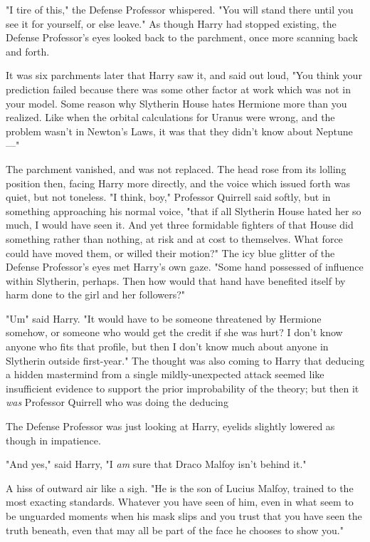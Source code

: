 "I tire of this," the Defense Professor whispered. "You will stand there until
you see it for yourself, or else leave." As though Harry had stopped existing,
the Defense Professor's eyes looked back to the parchment, once more scanning
back and forth.

It was six parchments later that Harry saw it, and said out loud, "You think
your prediction failed because there was some other factor at work which was
not in your model. Some reason why Slytherin House hates Hermione more than you
realized. Like when the orbital calculations for Uranus were wrong, and the
problem wasn't in Newton's Laws, it was that they didn't know about Neptune—"

The parchment vanished, and was not replaced. The head rose from its lolling
position then, facing Harry more directly, and the voice which issued forth was
quiet, but not toneless. "I think, boy," Professor Quirrell said softly, but in
something approaching his normal voice, "that if all Slytherin House hated her
so much, I would have seen it. And yet three formidable fighters of that House
did something rather than nothing, at risk and at cost to themselves. What
force could have moved them, or willed their motion?" The icy blue glitter of
the Defense Professor's eyes met Harry's own gaze. "Some hand possessed of
influence within Slytherin, perhaps. Then how would that hand have benefited
itself by harm done to the girl and her followers?"

"Um{\el}" said Harry. "It would have to be someone threatened by Hermione
somehow, or someone who would get the credit if she was hurt? I don't know
anyone who fits that profile, but then I don't know much about anyone in
Slytherin outside first-year." The thought was also coming to Harry that
deducing a hidden mastermind from a single mildly-unexpected attack seemed like
insufficient evidence to support the prior improbability of the theory; but
then it \emph{was} Professor Quirrell who was doing the deducing{\el}

The Defense Professor was just looking at Harry, eyelids slightly lowered as
though in impatience.

"And yes," said Harry, "I \emph{am} sure that Draco Malfoy isn't behind it."

A hiss of outward air like a sigh. "He is the son of Lucius Malfoy, trained to
the most exacting standards. Whatever you have seen of him, even in what seem
to be unguarded moments when his mask slips and you trust that you have seen
the truth beneath, even that may all be part of the face he chooses to show
you."

